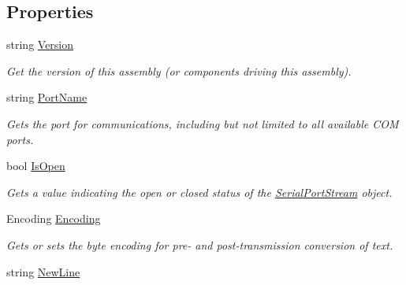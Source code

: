 \subsection*{Properties}
\begin{DoxyCompactItemize}
\item 
string \mbox{\hyperlink{class_r_j_c_p_1_1_i_o_1_1_ports_1_1_serial_port_stream_a1a440c81c5bb60740bec67f5b4e8061a}{Version}}
\begin{DoxyCompactList}\small\item\em Get the version of this assembly (or components driving this assembly). \end{DoxyCompactList}\item 
string \mbox{\hyperlink{class_r_j_c_p_1_1_i_o_1_1_ports_1_1_serial_port_stream_adea78dc38512b8fa2e857bd53253e6e3}{Port\+Name}}
\begin{DoxyCompactList}\small\item\em Gets the port for communications, including but not limited to all available C\+OM ports. \end{DoxyCompactList}\item 
bool \mbox{\hyperlink{class_r_j_c_p_1_1_i_o_1_1_ports_1_1_serial_port_stream_a45f781900a7c7f68361e71ee8b4965e5}{Is\+Open}}
\begin{DoxyCompactList}\small\item\em Gets a value indicating the open or closed status of the \mbox{\hyperlink{class_r_j_c_p_1_1_i_o_1_1_ports_1_1_serial_port_stream}{Serial\+Port\+Stream}} object. \end{DoxyCompactList}\item 
Encoding \mbox{\hyperlink{class_r_j_c_p_1_1_i_o_1_1_ports_1_1_serial_port_stream_af85636a42969de8a6db531e6463b0574}{Encoding}}
\begin{DoxyCompactList}\small\item\em Gets or sets the byte encoding for pre-\/ and post-\/transmission conversion of text. \end{DoxyCompactList}\item 
string \mbox{\hyperlink{class_r_j_c_p_1_1_i_o_1_1_ports_1_1_serial_port_stream_a74d04b36e5fb7701378a64584eefbd40}{New\+Line}}

\end{DoxyCompactItemize}
